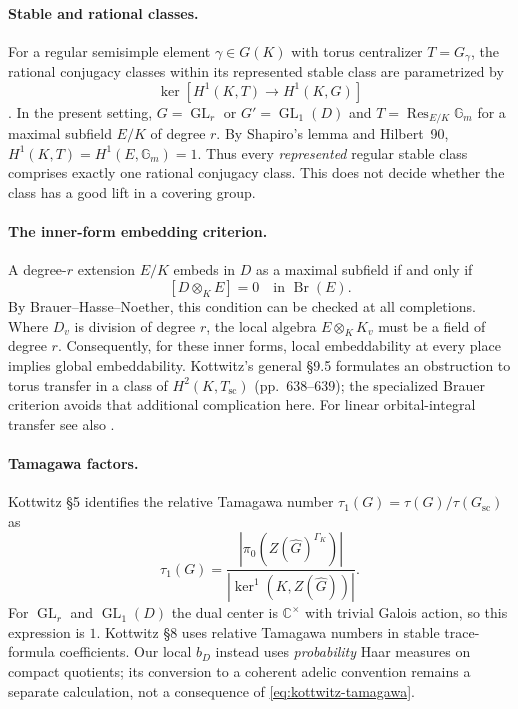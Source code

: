 \documentclass[11pt]{article}
\newcommand{\GL}{\operatorname{GL}}
\theoremstyle{plain}
\theoremstyle{definition}
\begin{document}
\paragraph{Stable and rational classes.}
For a regular semisimple element $\gamma\in G(K)$ with torus
centralizer $T=G_\gamma$, the rational conjugacy classes within
its represented stable class are parametrized by
\begin{equation}\label{eq:kottwitz-rational}
\ker\!\left[H^1(K,T)\longrightarrow H^1(K,G)\right]
\end{equation}
\cite[\S7.7]{Kottwitz84}. In the present setting,
$G=\GL_r$ or $G'=\GL_1(D)$ and
$T=\operatorname{Res}_{E/K}\mathbb G_m$ for a maximal subfield
$E/K$ of degree $r$. By Shapiro's lemma and Hilbert~90,
$H^1(K,T)=H^1(E,\mathbb G_m)=1$.
Thus every \emph{represented} regular stable class comprises
exactly one rational conjugacy class. This does not decide
whether the class has a good lift in a covering group.

\paragraph{The inner-form embedding criterion.}
A degree-$r$ extension $E/K$ embeds in $D$ as a maximal
subfield if and only if
\begin{equation}\label{eq:brauer-embedding}
[D\otimes_K E]=0\quad\text{in }\operatorname{Br}(E).
\end{equation}
By Brauer--Hasse--Noether, this condition can be checked at all
completions. Where $D_v$ is division of degree $r$, the local
algebra $E\otimes_K K_v$ must be a field of degree $r$.
Consequently, for these inner forms, local embeddability at every
place implies global embeddability. Kottwitz's general \S9.5
formulates an obstruction to torus transfer in a class of
$H^2(K,T_{\mathrm{sc}})$ (pp.~638--639); the specialized Brauer
criterion avoids that additional complication here. For linear
orbital-integral transfer see also \cite{Cohen}.

\paragraph{Tamagawa factors.}
Kottwitz \S5 identifies the relative Tamagawa number
$\tau_1(G)=\tau(G)/\tau(G_{\mathrm{sc}})$ as
\begin{equation}\label{eq:kottwitz-tamagawa}
\tau_1(G)=
\frac{|\pi_0(Z(\widehat G)^{\Gamma_K})|}
{|\ker^1(K,Z(\widehat G))|}.
\end{equation}
For $\GL_r$ and $\GL_1(D)$ the dual center is
$\mathbb C^\times$ with trivial Galois action, so this expression
is $1$. Kottwitz \S8 uses relative Tamagawa numbers in stable
trace-formula coefficients. Our local $b_D$ instead uses
\emph{probability} Haar measures on compact quotients; its
conversion to a coherent adelic convention remains a separate
calculation, not a consequence of \eqref{eq:kottwitz-tamagawa}.
\end{document}
